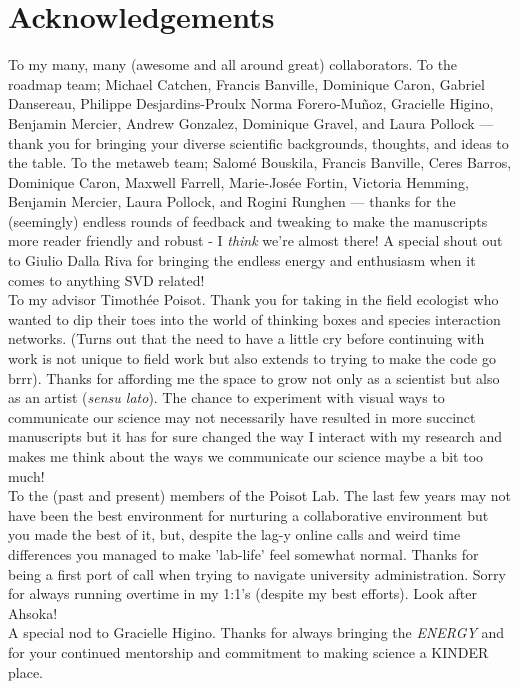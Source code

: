 \documentclass[12pt,twoside,phd]{dms}
\numberwithin{equation}{section}
\numberwithin{table}{chapter}
\numberwithin{figure}{chapter}
\begin{document}
\chapter*{Acknowledgements}

To my many, many (awesome and all around great) collaborators. To the roadmap team; Michael Catchen, Francis Banville, Dominique Caron, Gabriel Dansereau, Philippe Desjardins-Proulx Norma Forero-Muñoz, Gracielle Higino, Benjamin Mercier, Andrew Gonzalez, Dominique Gravel, and Laura Pollock --- thank you for bringing your diverse scientific backgrounds, thoughts, and ideas to the table. To the metaweb team; Salomé Bouskila, Francis Banville, Ceres Barros, Dominique Caron, Maxwell Farrell, Marie-Josée Fortin, Victoria Hemming, Benjamin Mercier, Laura Pollock, and Rogini Runghen --- thanks for the (seemingly) endless rounds of feedback and tweaking to make the manuscripts more reader friendly and robust - I \emph{think} we're almost there! A special shout out to Giulio Dalla Riva for bringing the endless energy and enthusiasm when it comes to anything SVD related!\\

To my advisor Timothée Poisot. Thank you for taking in the field ecologist who wanted to dip their toes into the world of thinking boxes and species interaction networks. (Turns out that the need to have a little cry before continuing with work is not unique to field work but also extends to trying to make the code go brrr). Thanks for affording me the space to grow not only as a scientist but also as an artist (\emph{sensu lato}). The chance to experiment with visual ways to communicate our science may not necessarily have resulted in more succinct manuscripts but it has for sure changed the way I interact with my research and makes me think about the ways we communicate our science maybe a bit too much!\\

To the (past and present) members of the Poisot Lab. The last few years may not have been the best environment for nurturing a collaborative environment but you made the best of it, but, despite the lag-y online calls and weird time differences you managed to make 'lab-life' feel somewhat normal. Thanks for being a first port of call when trying to navigate university administration. Sorry for  always running overtime in my 1:1's (despite my best efforts). Look after Ahsoka!\\

A special nod to Gracielle Higino. Thanks for always bringing the \emph{ENERGY} and for your continued mentorship and  commitment to making science a KINDER place.\\
\end{document}
